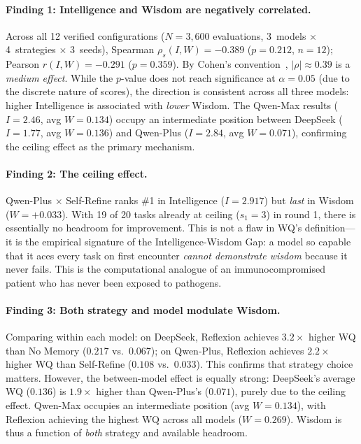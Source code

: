 \documentclass{article}
\begin{document}
\paragraph{Finding 1: Intelligence and Wisdom are negatively correlated.}
Across all 12 verified configurations ($N{=}3{,}600$ evaluations,
3~models $\times$ 4~strategies $\times$ 3~seeds),
Spearman $\rho_s(I, W) = -0.389$ ($p = 0.212$, $n{=}12$);
Pearson $r(I, W) = -0.291$ ($p = 0.359$).
By Cohen's convention~\cite{cohen1988}, $|\rho| \approx 0.39$ is a
\emph{medium effect}. While the $p$-value does not
reach significance at $\alpha{=}0.05$ (due to the discrete nature of scores),
the direction is consistent across all three models: higher Intelligence is
associated with \emph{lower} Wisdom. The Qwen-Max results ($I{=}2.46$,
avg $W{=}0.134$) occupy an intermediate position between DeepSeek
($I{=}1.77$, avg $W{=}0.136$) and Qwen-Plus ($I{=}2.84$, avg $W{=}0.071$),
confirming the ceiling effect as the primary mechanism.

\paragraph{Finding 2: The ceiling effect.}
Qwen-Plus $\times$ Self-Refine ranks \#1 in Intelligence ($I = 2.917$)
but \emph{last} in Wisdom ($W = +0.033$). With 19 of 20 tasks already
at ceiling ($s_1 = 3$) in round 1, there is essentially no headroom
for improvement. This is not a flaw in WQ's definition---it is the
empirical signature of the Intelligence-Wisdom Gap: a model so capable
that it aces every task on first encounter \emph{cannot demonstrate wisdom}
because it never fails. This is the computational analogue of an
immunocompromised patient who has never been exposed to pathogens.

\paragraph{Finding 3: Both strategy and model modulate Wisdom.}
Comparing within each model: on DeepSeek, Reflexion achieves $3.2\times$
higher WQ than No Memory ($0.217$ vs.\ $0.067$); on Qwen-Plus, Reflexion
achieves $2.2\times$ higher WQ than Self-Refine ($0.108$ vs.\ $0.033$).
This confirms that strategy choice matters. However, the between-model
effect is equally strong: DeepSeek's average WQ ($0.136$) is $1.9\times$
higher than Qwen-Plus's ($0.071$), purely due to the ceiling effect.
Qwen-Max occupies an intermediate position (avg $W{=}0.134$), with
Reflexion achieving the highest WQ across all models ($W{=}0.269$).
Wisdom is thus a function of \emph{both} strategy and available headroom.
\end{document}
